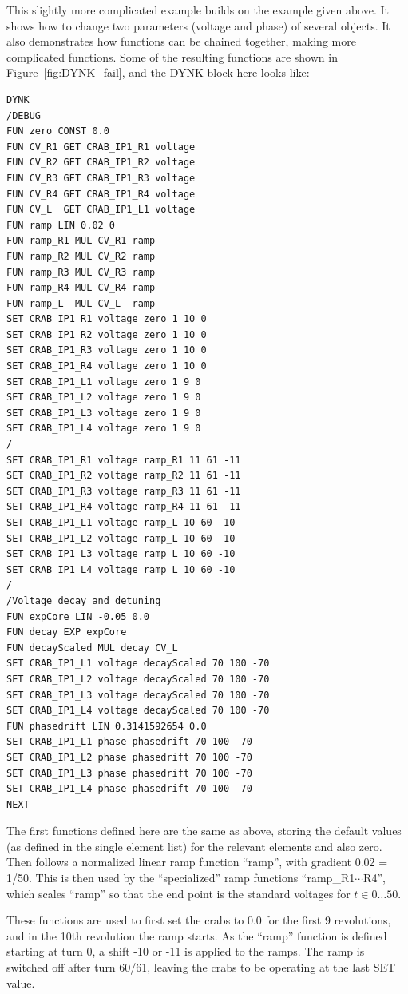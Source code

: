 This slightly more complicated example builds on the example given above.
It shows how to change two parameters (voltage and phase) of several objects.
It also demonstrates how functions can be chained together, making more complicated functions.
Some of the resulting functions are shown in Figure~\ref{fig:DYNK_fail}, and the DYNK block here looks like:
\begin{verbatim}
DYNK
/DEBUG
FUN zero CONST 0.0
FUN CV_R1 GET CRAB_IP1_R1 voltage
FUN CV_R2 GET CRAB_IP1_R2 voltage
FUN CV_R3 GET CRAB_IP1_R3 voltage
FUN CV_R4 GET CRAB_IP1_R4 voltage
FUN CV_L  GET CRAB_IP1_L1 voltage
FUN ramp LIN 0.02 0
FUN ramp_R1 MUL CV_R1 ramp
FUN ramp_R2 MUL CV_R2 ramp
FUN ramp_R3 MUL CV_R3 ramp
FUN ramp_R4 MUL CV_R4 ramp
FUN ramp_L  MUL CV_L  ramp
SET CRAB_IP1_R1 voltage zero 1 10 0
SET CRAB_IP1_R2 voltage zero 1 10 0
SET CRAB_IP1_R3 voltage zero 1 10 0
SET CRAB_IP1_R4 voltage zero 1 10 0
SET CRAB_IP1_L1 voltage zero 1 9 0
SET CRAB_IP1_L2 voltage zero 1 9 0
SET CRAB_IP1_L3 voltage zero 1 9 0
SET CRAB_IP1_L4 voltage zero 1 9 0
/
SET CRAB_IP1_R1 voltage ramp_R1 11 61 -11
SET CRAB_IP1_R2 voltage ramp_R2 11 61 -11
SET CRAB_IP1_R3 voltage ramp_R3 11 61 -11
SET CRAB_IP1_R4 voltage ramp_R4 11 61 -11
SET CRAB_IP1_L1 voltage ramp_L 10 60 -10
SET CRAB_IP1_L2 voltage ramp_L 10 60 -10
SET CRAB_IP1_L3 voltage ramp_L 10 60 -10
SET CRAB_IP1_L4 voltage ramp_L 10 60 -10
/
/Voltage decay and detuning
FUN expCore LIN -0.05 0.0
FUN decay EXP expCore
FUN decayScaled MUL decay CV_L
SET CRAB_IP1_L1 voltage decayScaled 70 100 -70
SET CRAB_IP1_L2 voltage decayScaled 70 100 -70
SET CRAB_IP1_L3 voltage decayScaled 70 100 -70
SET CRAB_IP1_L4 voltage decayScaled 70 100 -70
FUN phasedrift LIN 0.3141592654 0.0
SET CRAB_IP1_L1 phase phasedrift 70 100 -70
SET CRAB_IP1_L2 phase phasedrift 70 100 -70
SET CRAB_IP1_L3 phase phasedrift 70 100 -70
SET CRAB_IP1_L4 phase phasedrift 70 100 -70
NEXT
\end{verbatim}
The first functions defined here are the same as above, storing the default values (as defined in the single element list) for the relevant elements and also zero.
Then follows a normalized linear ramp function ``ramp'', with gradient 0.02 = 1/50.
This is then used by the ``specialized'' ramp functions ``ramp\_R1$\cdots$R4'', which scales ``ramp'' so that the end point is the standard voltages for $t\in 0\ldots50$.

These functions are used to first set the crabs to 0.0 for the first 9 revolutions, and in the 10th revolution the ramp starts.
As the ``ramp'' function is defined starting at turn 0, a shift -10 or -11 is applied to the ramps.
The ramp is switched off after turn 60/61, leaving the crabs to be operating at the last SET value.


